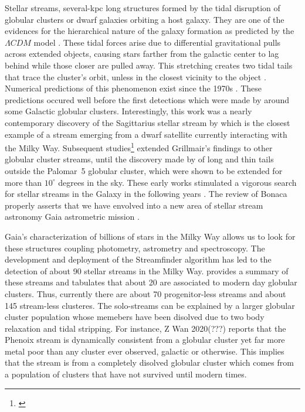 \documentclass[draft]{aa}
\begin{document}
  Stellar streams, several-kpc long structures formed by the tidal disruption of globular clusters or dwarf galaxies orbiting a host galaxy. They are one of the evidences for the hierarchical nature of the galaxy formation as predicted by the $\Lambda CDM$ model \citep{white91}. These tidal forces arise due to differential gravitational pulls across extended objects, causing stars farther from the galactic center to lag behind while those closer are pulled away. This stretching creates two tidal tails that trace the cluster's orbit, unless in the closest vicinity to the object \citep{2007ApJ...659.1212M}. Numerical predictions of this phenomenon exist since the 1970s \citep[see, for example][]{1975AJ.....80..290K}. These predictions occured well before the first detections which were made by \citet{1995AJ....109.2553G} around some Galactic globular clusters. Interestingly, this work was a nearly contemporary discovery of the Sagittarius stellar stream by \citet{1994Natur.370..194I} which is the closest example of a stream emerging from a dwarf satellite currently interacting with the Milky Way. Subsequent studies\footnote{\citep[see][for more subsequent observation detections of tidal debris, i.e. globular cluster stars beyond the tidal radius.]{1997A&A...320..776L, 2000A&A...356..127T, 2000A&A...359..907L, 2001AAS...19910906S, 2003AJ....126..815L}} extended Grillmair's findings to other globular cluster streams, until the discovery made by \citet{2001ApJ...548L.165O,2002AAS...200.1001O, 2003AJ....126.2385O} of long and thin tails outside the Palomar~5 globular cluster, which were shown to be extended for more than $10^\circ$ degrees in the sky. These early works stimulated a vigorous search for stellar streams in the Galaxy in the following years \citep{2006ApJ...643L..17G, 2006ApJ...637L..29B, 2006ApJ...637L..29B, 2009ApJ...693.1118G}. The review of Bonaca properly asserts that we have envolved into a new area of stellar stream astronomy Gaia astrometric mission \citep{2016A&A...595A...1G}. 
  
  Gaia's characterization of billions of stars in the Milky Way allows us to look for these structures coupling photometry, astrometry and spectroscopy. The development and deployment of the Streamfinder algorithm has led to the detection of about 90 stellar streams in the Milky Way. \citet{2023MNRAS.520.5225M} provides a summary of these streams and tabulates that about 20 are associated to modern day globular clusters. Thus, currently there are about 70 progenitor-less streams and about 145 stream-less clusteres. The solo-streams can be explained by a larger globular cluster population whose memebers have been disolved due to two body relaxation and tidal stripping. For instance, Z Wan 2020(???) reports that the Phenoix stream is dynamically consistent from a globular cluster yet far more metal poor than any cluster ever observed, galactic or otherwise. This implies that the stream is from a completely disolved globular cluster which comes from a population of clusters that have not survived until modern times. 
  
\end{document}
